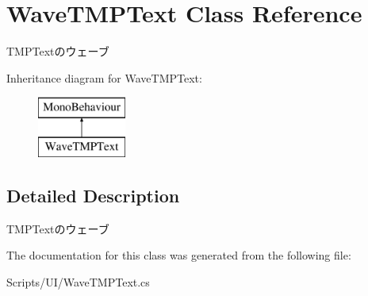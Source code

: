 \hypertarget{class_wave_t_m_p_text}{}\section{Wave\+T\+M\+P\+Text Class Reference}
\label{class_wave_t_m_p_text}


T\+M\+P\+Textのウェーブ  


Inheritance diagram for Wave\+T\+M\+P\+Text\+:\begin{figure}[H]
\begin{center}
\leavevmode
\includegraphics[height=2.000000cm]{class_wave_t_m_p_text}
\end{center}
\end{figure}


\subsection{Detailed Description}
T\+M\+P\+Textのウェーブ 



The documentation for this class was generated from the following file\+:\begin{DoxyCompactItemize}
\item 
Scripts/\+U\+I/Wave\+T\+M\+P\+Text.\+cs\end{DoxyCompactItemize}
